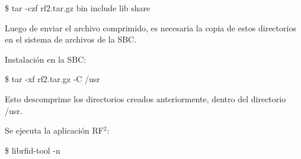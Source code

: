 \centerline{\$ tar -czf rf2.tar.gz bin include lib share}

\bigskip
Luego de enviar el archivo comprimido, es necesaria la copia de estos directorios en el sistema de archivos de la SBC.

\bigskip
Instalación en la SBC:

\centerline{\$ tar -xf rf2.tar.gz -C /usr}
Esto descomprime los directorios creados anteriormente, dentro del directorio /usr.

\bigskip
Se ejecuta la aplicación RF$^{2}$:

\centerline{\$ librfid-tool -n}

